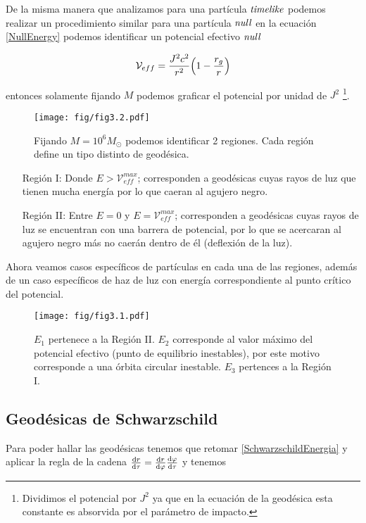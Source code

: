 \documentclass[../Main.tex]{subfiles}
\begin{document}
De la misma manera que analizamos para una partícula $\textit{timelike}$ podemos realizar un procedimiento similar para una partícula $\textit{null}$ en la ecuación \eqref{NullEnergy} podemos identificar un potencial efectivo $\textit{null}$

\begin{equation}
    \mathcal{V}_{eff} = \dfrac{J^{2}c^{2}}{r^{2}}\qty(1-\dfrac{r_{g}}{r})
\end{equation}


entonces solamente fijando $M$ podemos graficar el potencial por unidad de $J^{2}$ \footnote{Dividimos el potencial por $J^{2}$ ya que en la ecuación de la geodésica esta constante es absorvida por el parámetro de impacto.}.

\begin{figure}[H]
    \centering
    \texttt{[image: fig/fig3.2.pdf]}
    \caption{Fijando $M=10^6 M_\odot$ podemos identificar 2 regiones. Cada región define un tipo distinto de geodésica.}
    \label{potencial:regionesnull}
\end{figure}

\begin{itemize}
    \item [Región I:] Donde $E>\mathcal{V}^{max}_{eff}$; corresponden a geodésicas cuyas rayos de luz que tienen mucha energía por lo que caeran al agujero negro.
    \item [Región II:] Entre $E=0$ y $E=\mathcal{V}^{max}_{eff}$; corresponden a geodésicas cuyas rayos de luz se encuentran con una barrera de potencial, por lo que se acercaran al agujero negro más no caerán dentro de él (deflexión de la luz).
\end{itemize}

Ahora veamos casos específicos de partículas en cada una de las regiones, además de un caso específicos de haz de luz con energía correspondiente al punto crítico del potencial.

\begin{figure}[H]
    \centering
    \texttt{[image: fig/fig3.1.pdf]}
    \caption{$E_1$ pertenece a la Región II. $E_2$ corresponde al valor máximo del potencial efectivo (punto de equilibrio inestables), por este motivo corresponde a una órbita circular inestable. $E_3$ pertences a la Región I.}
    \label{potencial:regionesnullparticles}
\end{figure}

\subsection{Geodésicas de Schwarzschild}
Para poder hallar las geodésicas tenemos que retomar \eqref{SchwarzschildEnergia} y aplicar la regla de la cadena $\dv{r}{\tau}=\dv{r}{\varphi}\dv{\varphi}{\tau}$ y tenemos 
\end{document}
